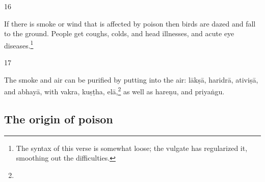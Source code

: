 \begin{translation}
\item [16]  

If there is smoke or wind that  is affected by poison then  birds are
dazed and fall to the ground.  People get  coughs, colds, and head 
illnesses, and acute eye diseases.\footnote{The syntax  of this verse
    is somewhat  loose; the vulgate has regularized it, smoothing  out
    the difficulties.}

\item
[17]  

The smoke and air can be  purified by putting into the  air:  \gls{lākṣā}, 
\gls{haridrā}, \gls{ativiṣā}, and \gls{abhayā}, with \gls{vakra}, \gls{kuṣṭha}, 
\gls{elā},\footnote{} as well as \gls{hareṇu}, and \gls{priyaṅgu}.  
\end{translation}  


\subsection{The origin of  poison}  

